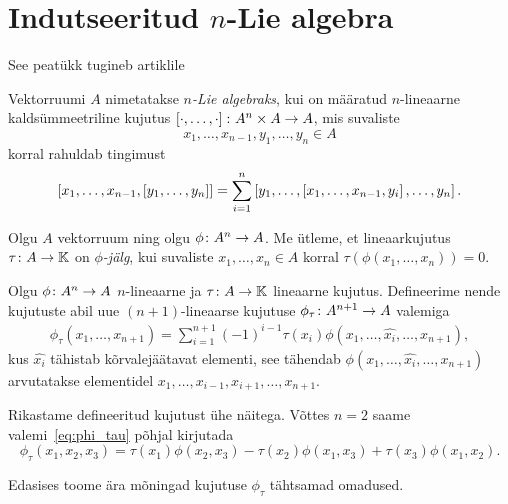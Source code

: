 

\section{Indutseeritud \texorpdfstring{$n$}\ -Lie algebra}

See peatükk tugineb artiklile \cite{AKMS:2014}

\begin{dfn}
    Vektorruumi $A$ nimetatakse \emph{$n$-Lie algebraks}, kui on
    määratud $n$-lineaarne kaldsümmeetriline kujutus
    $\left[ \cdot, \dots, \cdot \right] \colon A^n \times A \to A$, mis
    suvaliste
    \[ x_1, \dots, x_{n-1}, y_1, \dots, y_n \in A \]
    korral rahuldab tingimust
    \[
        \left[ x_1, \dots, x_{n-1}, \left[ y_1, \dots, y_n \right] \right] =
        \sum_{i=1}^n \left[
            y_1, \dots, \left[ x_1, \dots, x_{n-1}, y_i \right], \dots, y_n
        \right].
    \]
\end{dfn}

\begin{dfn}[Jälg]
    Olgu $A$ vektorruum ning olgu $\phi \colon A^n \to A$. Me
    ütleme, et lineaarkujutus $\tau \colon A \to \mathbb{K}$ on
    \emph{$\phi$-jälg}, kui suvaliste $x_1, \dots, x_n \in A$ korral
    $\tau \left( \phi \left( x_1, \dots, x_n \right) \right) = 0$.
\end{dfn}

Olgu $\phi \colon A^n \to A$ $n$-lineaarne ja
$\tau \colon A \to \mathbb{K}$ lineaarne kujutus. Defineerime nende
kujutuste abil uue $(n+1)$-lineaarse kujutuse
$\phi_\tau \colon A^{n+1} \to A$ valemiga
\begin{align}\label{eq:phi_tau}
    \phi_\tau \left( x_1, \dots, x_{n+1} \right) =
    \sum_{i=1}^{n+1} (-1)^{i-1} \tau(x_i)
        \phi(x_1, \dots, \hat{x_i}, \dots, x_{n+1}),
\end{align}
kus $\hat{x_i}$ tähistab kõrvalejäätavat elementi, see tähendab
$\phi(x_1, \dots, \hat{x_i}, \dots, x_{n+1})$ arvutatakse elementidel
$x_1, \dots, x_{i-1}, x_{i+1}, \dots, x_{n+1}$.

Rikastame defineeritud kujutust ühe näitega. Võttes $n = 2$ saame
valemi~\ref{eq:phi_tau} põhjal kirjutada
\[
    \phi_\tau (x_1, x_2, x_3) =
        \tau(x_1) \phi(x_2, x_3) -
        \tau(x_2) \phi(x_1, x_3) +
        \tau(x_3) \phi(x_1, x_2).
\]

Edasises toome ära mõningad kujutuse $\phi_\tau$ tähtsamad omadused.

